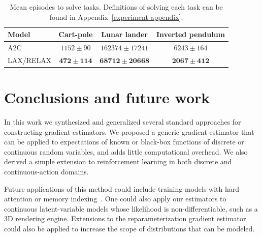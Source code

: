 \documentclass{article}
\begin{document}
\begin{table}%
\centering
\begin{tabular}{l | c c c }%
\textbf{Model} & Cart-pole & Lunar lander & Inverted pendulum \\\midrule%
A2C             & $1152 \pm 90$ & $162374 \pm 17241$                    & $6243 \pm 164$ \\%
LAX/RELAX & $\bm{472 \pm 114}$ & $\bm{68712 \pm 20668}$ & $\bm{2067 \pm 412}$ \\%
\end{tabular}
\caption{Mean episodes to solve tasks.
Definitions of solving each task can be found in Appendix~\ref{experiment appendix}.}
\label{tab:rl_results}
\end{table}



\section{Conclusions and future work}
\label{conclusion}
In this work we synthesized and generalized several standard approaches for constructing gradient estimators.
We proposed a generic gradient estimator that can be applied to expectations of known or black-box functions of discrete or continuous random variables, and adds little computational overhead.
We also derived a simple extension to reinforcement learning in both discrete and continuous-action domains. 


Future applications of this method could include training models with hard attention or memory indexing~\citep{zaremba2015reinforcement}.
One could also apply our estimators to continuous latent-variable models whose likelihood is non-differentiable, such as a 3D rendering engine.
Extensions to the reparameterization gradient estimator~\citep{ruiz2016generalized, naesseth2017reparameterization} could also be applied to increase the scope of distributions that can be modeled. 
%
\end{document}
